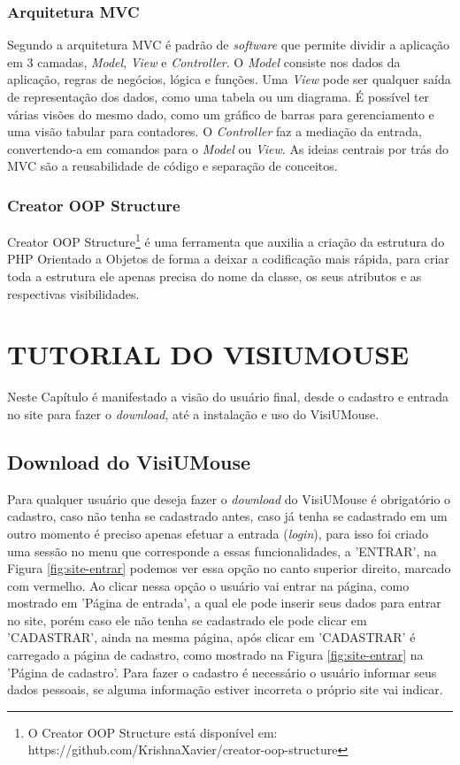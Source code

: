\subsection{Arquitetura MVC}

Segundo  a arquitetura MVC é padrão de \textit{software} que permite dividir a aplicação em 3 camadas, \textit{Model}, \textit{View} e \textit{Controller}. O \textit{Model} consiste nos dados da aplicação, regras de negócios, lógica e funções. Uma \textit{View} pode ser qualquer saída de representação dos dados, como uma tabela ou um diagrama. É possível ter várias visões do mesmo dado, como um gráfico de barras para gerenciamento e uma visão tabular para contadores. O \textit{Controller} faz a mediação da entrada, convertendo-a em comandos para o \textit{Model} ou \textit{View}. As ideias centrais por trás do MVC são a reusabilidade de código e separação de conceitos.

\subsection{Creator OOP Structure}

Creator OOP Structure\footnote{O Creator OOP Structure está disponível em: https://github.com/KrishnaXavier/creator-oop-structure}  é uma ferramenta que auxilia a criação da estrutura do PHP Orientado a Objetos de forma a deixar a codificação mais rápida, para criar toda a estrutura ele apenas precisa do nome da classe, os seus atributos e as respectivas visibilidades.



\chapter{TUTORIAL DO VISIUMOUSE}\label{CAP-tecnologia-visiumouse}
Neste Capítulo é manifestado a visão do usuário final, desde o cadastro e entrada no site para fazer o \textit{download}, até a instalação e uso do VisiUMouse. 

\section{Download do VisiUMouse}
Para qualquer usuário que deseja fazer o \textit{download} do VisiUMouse é obrigatório o cadastro, caso não tenha se cadastrado antes, caso já tenha se cadastrado em um outro momento é preciso apenas efetuar a entrada (\textit{login}), para isso foi criado uma sessão no menu que corresponde a essas funcionalidades, a 'ENTRAR', na Figura \ref{fig:site-entrar} podemos ver essa opção no canto superior direito, marcado com vermelho. Ao clicar nessa opção o usuário vai entrar na página, como mostrado em 'Página de entrada', a qual ele pode inserir seus dados para entrar no site, porém caso ele não tenha se cadastrado ele pode clicar em 'CADASTRAR', ainda na mesma página, após clicar em 'CADASTRAR' é carregado a página de cadastro, como mostrado na Figura \ref{fig:site-entrar} na 'Página de cadastro'. Para fazer o cadastro é necessário o usuário informar seus dados pessoais, se alguma informação estiver incorreta o próprio site vai indicar. 

